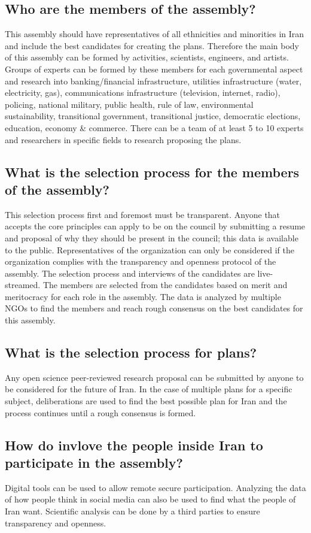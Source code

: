 \documentclass{IEEEtran}
\begin{document}
\subsection{Who are the members of the assembly?}
This assembly should have representatives of all ethnicities and minorities in Iran and include the best candidates for creating the plans.
 Therefore the main body of this assembly can be formed by activities, scientists, engineers, and artists.
  Groups of experts can be formed by these members for each governmental aspect and research into 
  banking/financial infrastructure, utilities infrastructure (water, electricity, gas), communications infrastructure (television, internet, radio), policing, 
  national military, public health, rule of law, environmental sustainability, transitional government,
   transitional justice, democratic elections, education, economy \& commerce.
There can be a team of at least 5 to 10 experts and researchers in specific fields to research proposing the plans.

\subsection{What is the selection process for the members of the assembly?}
This selection process first and foremost must be transparent. Anyone that accepts the core principles can apply to be on the council by submitting a resume and proposal of why they should be present in the council; this data is available to the public. Representatives of the organization can only be considered if the organization complies with the transparency and openness protocol of the assembly. The selection process and interviews of the candidates are live-streamed. The members are selected from the candidates based on merit and meritocracy for each role in the assembly. The data is analyzed by multiple NGOs to find the members and reach rough consensus on the best candidates for this assembly.
\subsection{What is the selection process for plans?}
Any open science peer-reviewed research proposal can be submitted by anyone to be considered for the future of Iran. In the case of multiple plans for a specific subject, deliberations are used to find the best possible plan for Iran and the process continues until a rough consensus is formed.

\subsection{How do invlove the people inside Iran to participate in the assembly?}
Digital tools can be used to allow remote secure participation. Analyzing the data of how people think in social media can also be used to find what the people of Iran want. Scientific analysis can be done by a third parties to ensure transparency and openness.
\end{document}
